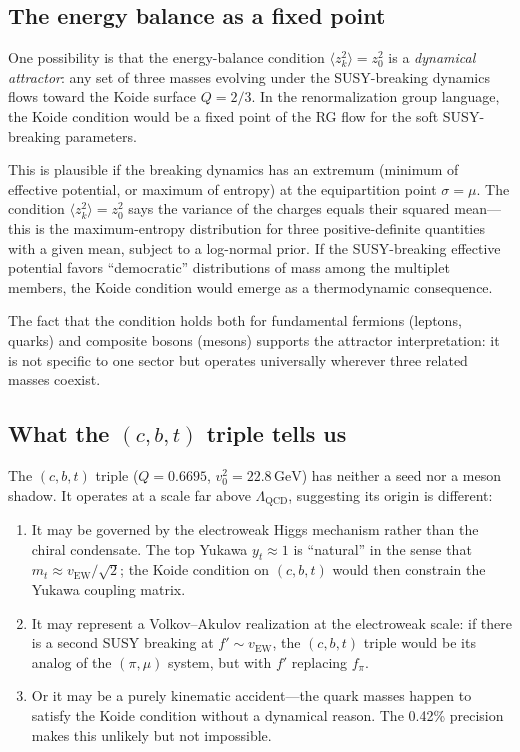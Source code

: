 \documentclass[12pt,a4paper]{article}
\newcommand{\GeV}{\,\text{GeV}}
\begin{document}
\subsection{The energy balance as a fixed point}

One possibility is that the energy-balance condition 
$\langle z_k^2\rangle = z_0^2$ is a \emph{dynamical attractor}: 
any set of three masses evolving under the SUSY-breaking dynamics 
flows toward the Koide surface $Q = 2/3$. In the renormalization 
group language, the Koide condition would be a fixed point of the 
RG flow for the soft SUSY-breaking parameters.

This is plausible if the breaking dynamics has an extremum (minimum 
of effective potential, or maximum of entropy) at the equipartition 
point $\sigma = \mu$. The condition $\langle z_k^2\rangle = z_0^2$ 
says the variance of the charges equals their squared mean---this 
is the maximum-entropy distribution for three positive-definite 
quantities with a given mean, subject to a log-normal prior. If 
the SUSY-breaking effective potential favors ``democratic'' 
distributions of mass among the multiplet members, the Koide 
condition would emerge as a thermodynamic consequence.

The fact that the condition holds both for fundamental fermions 
(leptons, quarks) and composite bosons (mesons) supports the 
attractor interpretation: it is not specific to one sector but 
operates universally wherever three related masses coexist.

\subsection{What the $(c,b,t)$ triple tells us}

The $(c,b,t)$ triple ($Q = 0.6695$, $v_0^2 = 22.8\GeV$) has 
neither a seed nor a meson shadow. It operates at a scale far 
above $\Lambda_{\text{QCD}}$, suggesting its origin is different:

\begin{enumerate}
\item It may be governed by the electroweak Higgs mechanism rather 
than the chiral condensate. The top Yukawa $y_t \approx 1$ is 
``natural'' in the sense that $m_t \approx v_{\text{EW}}/\sqrt{2}$; 
the Koide condition on $(c,b,t)$ would then constrain the Yukawa 
coupling matrix.
\item It may represent a Volkov--Akulov realization at the 
electroweak scale: if there is a second SUSY breaking at 
$f' \sim v_{\text{EW}}$, the $(c,b,t)$ triple would be its 
analog of the $(\pi, \mu)$ system, but with $f'$ replacing $f_\pi$.
\item Or it may be a purely kinematic accident---the quark masses 
happen to satisfy the Koide condition without a dynamical reason. 
The 0.42\% precision makes this unlikely but not impossible.
\end{enumerate}
\end{document}
